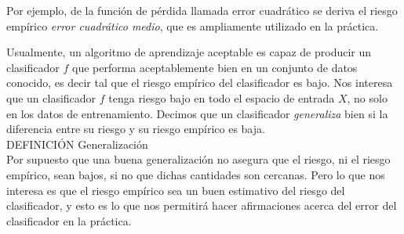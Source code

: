 \documentclass{article}
\begin{document}
Por ejemplo, de la función de pérdida llamada error cuadrático se deriva el riesgo empírico \textit{error cuadrático medio}, que es ampliamente
utilizado en la práctica.

Usualmente, un algoritmo de aprendizaje aceptable es capaz de producir un clasificador $f$ que performa aceptablemente bien en un conjunto de datos
conocido, es decir tal que el riesgo empírico del clasificador es bajo. Nos interesa que un clasificador $f$ tenga riesgo bajo en todo el espacio
de entrada $X$, no solo en los datos de entrenamiento. Decimos que un clasificador \textit{generaliza} bien si la diferencia entre su riesgo
y su riesgo empírico es baja.\\

DEFINICIÓN Generalización\\

Por supuesto que una buena generalización no asegura que el riesgo, ni el riesgo empírico, sean bajos, si no que dichas cantidades son cercanas.
Pero lo que nos interesa es que el riesgo empírico sea un buen estimativo del riesgo del clasificador, y esto es lo que nos permitirá
hacer afirmaciones acerca del error del clasificador en la práctica.
\end{document}
